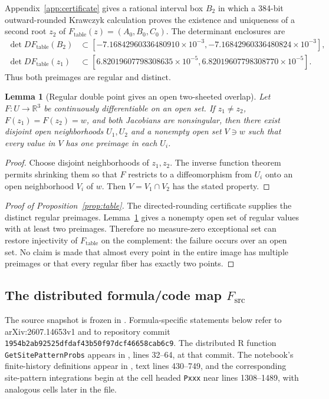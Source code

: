 \documentclass[11pt]{article}
\newtheorem{lemma}[theorem]{Lemma}
\newcommand{\Table}{F_{\mathrm{table}}}
\newcommand{\Src}{F_{\mathrm{src}}}
\begin{document}
Appendix~\ref{app:certificate} gives a rational interval box $B_2$ in which a 384-bit outward-rounded Krawczyk calculation proves the existence and uniqueness of a second root $z_2$ of
$\Table(z)=(A_0,B_0,C_0)$.  The determinant enclosures are
\begin{align*}
\det D\Table(B_2)&\subset
[-7.16842960336480910\times10^{-3},
 -7.16842960336480824\times10^{-3}],\\
\det D\Table(z_1)&\subset
[6.82019607798308635\times10^{-5},
 6.82019607798308770\times10^{-5}].
\end{align*}
Thus both preimages are regular and distinct.

\begin{lemma}[Regular double point gives an open two-sheeted overlap]\label{lem:ift}
Let $F:U\to\mathbb R^3$ be continuously differentiable on an open set.  If $z_1\ne z_2$, $F(z_1)=F(z_2)=w$, and both Jacobians are nonsingular, then there exist disjoint open neighborhoods $U_1,U_2$ and a nonempty open set $V\ni w$ such that every value in $V$ has one preimage in each $U_i$.
\end{lemma}
\begin{proof}
Choose disjoint neighborhoods of $z_1,z_2$.  The inverse function theorem permits shrinking them so that $F$ restricts to a diffeomorphism from $U_i$ onto an open neighborhood $V_i$ of $w$.  Then $V=V_1\cap V_2$ has the stated property.
\end{proof}

\begin{proof}[Proof of Proposition~\ref{prop:table}]
The directed-rounding certificate supplies the distinct regular preimages.  Lemma~\ref{lem:ift} gives a nonempty open set of regular values with at least two preimages.  Therefore no measure-zero exceptional set can restore injectivity of $\Table$ on the complement: the failure occurs over an open set.  No claim is made that almost every point in the entire image has multiple preimages or that every regular fiber has exactly two points.
\end{proof}

\subsection{The distributed formula/code map \texorpdfstring{$\Src$}{Fsrc}}
The source snapshot is frozen in .  Formula-specific statements below refer to arXiv:2607.14653v1 and to repository commit
\texttt{1954b2ab92525dfdaf43b50f97dcf46658cab6c9}.  The distributed R function \texttt{GetSitePatternProbs} appears in , lines 32--64, at that commit.  The notebook's finite-history definitions appear in , text lines 430--749, and the corresponding site-pattern integrations begin at the cell headed \texttt{Pxxx} near lines 1308--1489, with analogous cells later in the file.
\end{document}
